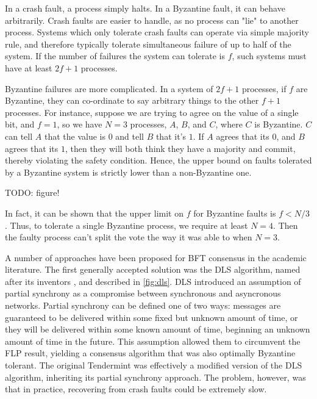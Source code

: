 In a crash fault, a process simply halts. In a Byzantine fault, it can behave arbitrarily.
Crash faults are easier to handle, as no process can "lie" to another process.
Systems which only tolerate crash faults can operate via simple majority rule, 
and therefore typically tolerate simultaneous failure of up to half of the system.
If the number of failures the system can tolerate is $f$, such systems must have at least $2f+1$ processes.

Byzantine failures are more complicated. In a system of $2f+1$ processes, if $f$ are Byzantine, 
they can co-ordinate to say arbitrary things to the other $f+1$ processes.
For instance, suppose we are trying to agree on the value of a single bit, 
and $f=1$, so we have $N=3$ processes, $A$, $B$, and $C$, where $C$ is Byzantine.
$C$ can tell $A$ that the value is $0$ and tell $B$ that it's $1$. 
If $A$ agrees that its $0$, and $B$ agrees that its $1$, then they will both think they have a majority and commit, 
thereby violating the safety condition.
Hence, the upper bound on faults tolerated by a Byzantine system is strictly lower than a non-Byzantine one.

TODO: figure!

In fact, it can be shown that the upper limit on $f$ for Byzantine faults is $f < N/3$ \cite{pease1980reaching}.
Thus, to tolerate a single Byzantine process, we require at least $N=4$. 
Then the faulty process can't split the vote the way it was able to when $N=3$.

A number of approaches have been proposed for BFT consensus in the academic literature.
The first generally accepted solution was the DLS algorithm, named after its inventors \cite{dls}, and described in \ref{fig:dls}.
DLS introduced an assumption of partial synchrony as a compromise between synchronous and asyncronous networks.
Partial synchrony can be defined one of two ways: 
messages are guaranteed to be delivered within some fixed but unknown amount of time,
or they will be delivered within some known amount of time, beginning an unknown amount of time in the future.
This assumption allowed them to circumvent the FLP result, yielding a consensus algorithm that was also optimally Byzantine tolerant.
The original Tendermint was effectively a modified version of the DLS algorithm, inheriting its partial synchrony approach.
The problem, however, was that in practice, recovering from crash faults could be extremely slow.

